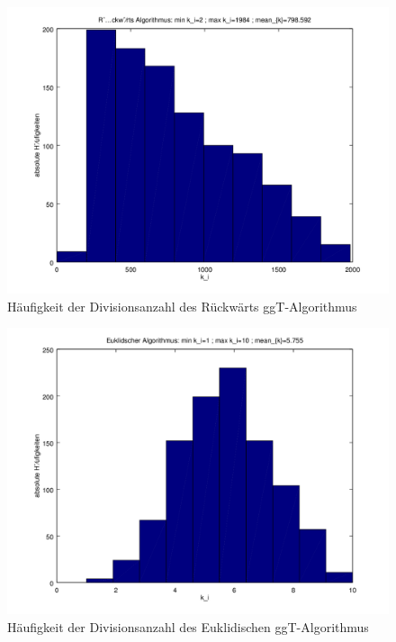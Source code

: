 \documentclass{llncs}
\begin{document}
\begin{figure}[h]
\centering
	\includegraphics[width=1.0\textwidth]{Code/rwAlgo_Histogramm.png}
		\caption{Häufigkeit der Divisionsanzahl des Rückwärts ggT-Algorithmus}
\end{figure}
\begin{figure}[h]
\centering
\includegraphics[width=1.0\textwidth]{Code/euklidAlgo_Histogramm.png}
		\caption{Häufigkeit der Divisionsanzahl des Euklidischen ggT-Algorithmus}
\end{figure}
\clearpage
\newpage
\end{document}
